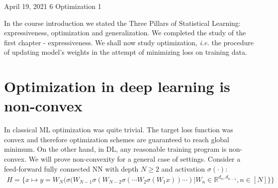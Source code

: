\documentclass[12pt]{article}
\newcommand{\ie}{{\it i.e. }}
\begin{document}
	
	{April 19, 2021}												%
	{6}																		 %
	{Optimization 1}			%
	
	\noindent
	In the course introduction we stated the Three Pillars of Statistical Learning: expressiveness, optimization and generalization.
	We completed the study of the first chapter - expressiveness.
	We shall now study optimization, \ie the procedure of updating model's weights in the attempt of minimizing loss on training data.
	
	
	\section{Optimization in deep learning is non-convex}
	In classical ML optimization was quite trivial. The target loss function was convex and therefore optimization schemes are guaranteed to reach global minimum.
	On the other hand, in DL, any reasonable training program is non-convex.
	We will prove non-convexity for a general case of settings. Consider a feed-forward fully connected NN with depth $N\geq2$ and activation $\sigma(\cdot)$:
	\begin{align} \label{eq:feed-forward fully connected NN}
		H = \{x \mapsto y = W_N(\sigma( W_{N-1}\sigma(W_{N-2}\sigma(\cdots W_2\sigma(W_1x))\cdots) | W_n\in\mathbb{R}^{d_n,d_{n-1}}, n\in [N]\} \}
	\end{align}
	
\end{document}
